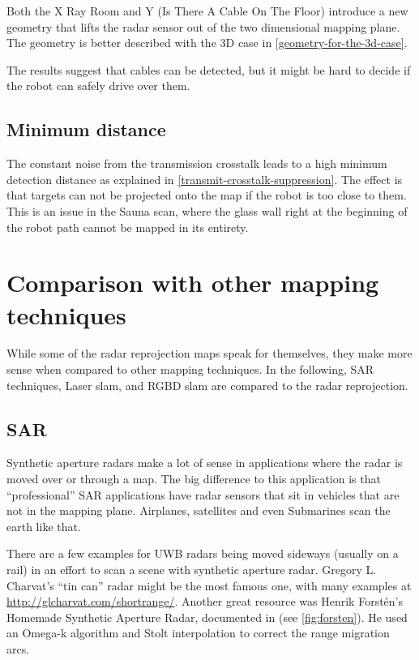 Both the X Ray Room and Y (Is There A Cable On The Floor) introduce a
new geometry that lifts the radar sensor out of the two dimensional
mapping plane. The geometry is better described with the 3D case in \cref{geometry-for-the-3d-case}.

The results suggest that cables can be detected, but it might be hard to decide if the robot can safely drive over them.

\subsection{Minimum distance}\label{minimum-distance}

The constant noise from the transmission crosstalk leads to a high
minimum detection distance as explained in \cref{transmit-crosstalk-suppression}. The effect is that
targets can not be projected onto the map if the robot is too close to
them. This is an issue in the Sauna scan, where the glass wall right at
the beginning of the robot path cannot be mapped in its entirety.



\section{Comparison with other mapping techniques} \label{comparison-with-other-mapping-techniques}

While some of the radar reprojection maps speak for themselves, they
make more sense when compared to other mapping techniques. In the
following, SAR techniques, Laser slam, and RGBD slam are compared to the
radar reprojection.

\subsection{SAR}\label{sar-1}
Synthetic aperture radars make a lot of sense in applications
where the radar is moved over or through a map. The big difference to
this application is that ``professional'' SAR applications have radar
sensors that sit in vehicles that are not in the mapping plane.
Airplanes, satellites and even Submarines scan the earth like that.

There are a few examples for UWB radars being moved sideways (usually on a rail) in an effort to scan a scene with synthetic aperture radar.
Gregory L. Charvat's ``tin can'' radar \cite{Charvat2014} might be the most famous one, with many examples at \url{http://glcharvat.com/shortrange/}.
Another great resource was Henrik Forstén's Homemade Synthetic Aperture
Radar, documented in \cite{Forsten2015} (see \cref{fig:forsten}). He used an Omega-k algorithm \cite{Tolman2008} and Stolt interpolation \cite{Cumming2004} to correct the range migration arcs.

